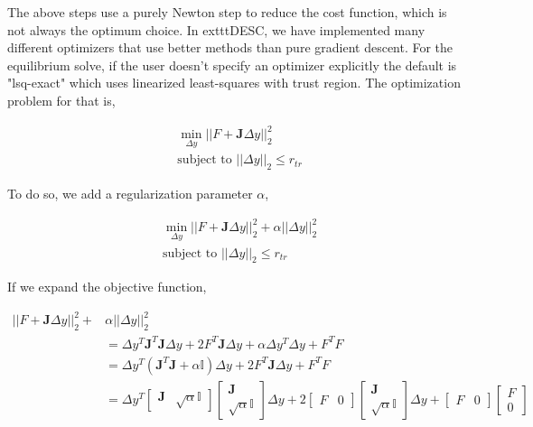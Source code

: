 The above steps use a purely Newton step to reduce the cost function, which is not always the optimum choice. In 	exttt{DESC}, we have implemented many different optimizers that use better methods than pure gradient descent. For the equilibrium solve, if the user doesn't specify an optimizer explicitly the default is "lsq-exact" which uses linearized least-squares with trust region. The optimization problem for that is, 

\begin{align*}
    &\min_{\Delta y} ||F  + \mathbf{J} \Delta y||^2_2 \\
    &\text{subject to } ||\Delta y||_2 \leq r_{tr}
\end{align*}

To do so, we add a regularization parameter $\alpha$,

\begin{align*}
    &\min_{\Delta y} ||F  + \mathbf{J} \Delta y||^2_2 + \alpha||\Delta y||_2^2  \\
    &\text{subject to } ||\Delta y||_2 \leq r_{tr}
\end{align*}

If we expand the objective function,

\begin{align*}
    ||F  + \mathbf{J} \Delta y||^2_2 + &\alpha||\Delta y||_2^2 \\
    &= \Delta y^T \mathbf{J}^T \mathbf{J} \Delta y + 2F^T\mathbf{J} \Delta y + \alpha \Delta y^T\Delta y + F^TF \\
    &= \Delta y^T (\mathbf{J}^T \mathbf{J} + \alpha \mathbb{I}) \Delta y + 2F^T\mathbf{J} \Delta y + F^TF \\
    &= \Delta y^T \begin{bmatrix}
        \mathbf{J} & \sqrt{\alpha} \mathbb{I}
    \end{bmatrix} \begin{bmatrix}
        \mathbf{J} \\ \sqrt{\alpha} \mathbb{I}
    \end{bmatrix} \Delta y + 2\begin{bmatrix}
        F & 0
    \end{bmatrix} \begin{bmatrix}
        \mathbf{J} \\ \sqrt{\alpha} \mathbb{I}
    \end{bmatrix} \Delta y + \begin{bmatrix}
        F & 0
    \end{bmatrix} \begin{bmatrix}
        F \\ 0
    \end{bmatrix}
\end{align*}

